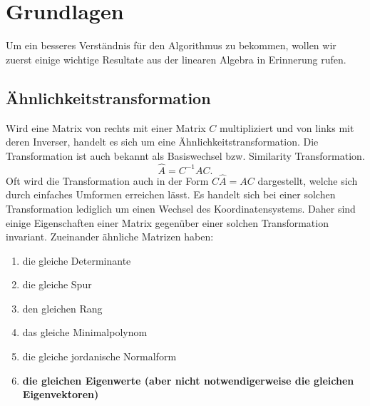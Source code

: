 \section{Grundlagen\label{francis:section:grundlagen}}
Um ein besseres Verständnis für den Algorithmus zu bekommen, wollen wir zuerst einige wichtige Resultate aus der linearen Algebra in Erinnerung rufen.

\subsection{Ähnlichkeitstransformation\label{francis:section:grundlagen:aehnlichkeitstransform}}
Wird eine Matrix von rechts mit einer Matrix $C$ multipliziert und von links mit deren Inverser, handelt es sich um eine Ähnlichkeitstransformation. Die Transformation ist auch bekannt als Basiswechsel bzw. Similarity Transformation.
\begin{equation}
	\hat{A}=C^{-1}AC.
\end{equation}
Oft wird die Transformation auch in der Form $C\hat{A}=AC$ dargestellt, welche sich durch einfaches Umformen erreichen lässt.
Es handelt sich bei einer solchen Transformation lediglich um einen Wechsel des Koordinatensystems.
Daher sind einige Eigenschaften einer Matrix gegenüber einer solchen Transformation invariant.
Zueinander ähnliche Matrizen haben:
\begin{enumerate}
	\item die gleiche Determinante
	\item die gleiche Spur
	\item den gleichen Rang
	\item das gleiche Minimalpolynom
	\item die gleiche jordanische Normalform
	\item \textbf{die gleichen Eigenwerte (aber nicht notwendigerweise die gleichen Eigenvektoren)}
\end{enumerate}

